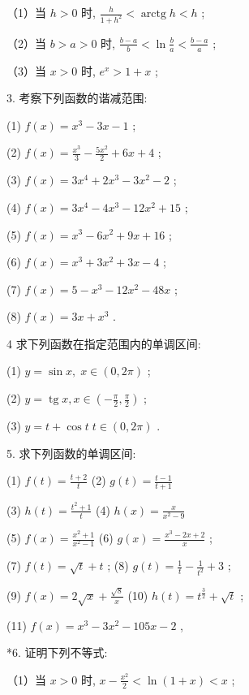 \documentclass[10pt]{article}
\begin{document}
（1）当 \(h > 0\) 时, \(\frac{h}{1 + {h}^{2}} < \operatorname{arctg}h < h\) ;

（2）当 \(b > a > 0\) 时, \(\frac{b - a}{b} < \ln \frac{b}{a} < \frac{b - a}{a}\) ;

（3）当 \(x > 0\) 时, \({e}^{x} > 1 + x\) ;

3. 考察下列函数的谐减范围:

(1) \(f\left( x\right) = {x}^{3} - {3x} - 1\) ;

(2) \(f\left( x\right) = \frac{{x}^{3}}{3} - \frac{5{x}^{2}}{2} + {6x} + 4\) ;

(3) \(f\left( x\right) = 3{x}^{4} + 2{x}^{3} - 3{x}^{2} - 2\) ;

(4) \(f\left( x\right) = 3{x}^{4} - 4{x}^{3} - {12}{x}^{2} + {15}\) ;

(5) \(f\left( x\right) = {x}^{3} - 6{x}^{2} + {9x} + {16}\) ;

(6) \(f\left( x\right) = {x}^{3} + 3{x}^{2} + {3x} - 4\) ;

(7) \(f\left( x\right) = 5 - {x}^{3} - {12}{x}^{2} - {48x}\) ;

(8) \(f\left( x\right) = {3x} + {x}^{3}\) .

4 求下列函数在指定范围内的单调区间:

(1) \(y = \sin x,\;x \in \left( {0,{2\pi }}\right)\) ;

(2) \(y = \operatorname{tg}x,x \in \left( {-\frac{\pi }{2},\frac{\pi }{2}}\right)\) ;

(3) \(y = t + \cos t\;t \in \left( {0,{2\pi }}\right)\) .

5. 求下列函数的单调区间:

(1) \(f\left( t\right) = \frac{t + 2}{t}\) (2) \(g\left( t\right) = \frac{t - 1}{t + 1}\)

(3) \(h\left( t\right) = \frac{{t}^{2} + 1}{t}\) (4) \(h\left( x\right) = \frac{x}{{x}^{2} - 9}\)

(5) \(f\left( x\right) = \frac{{x}^{2} + 1}{{x}^{2} - 1}\) (6) \(g\left( x\right) = \frac{{x}^{3} - {2x} + 2}{x}\) ;

(7) \(f\left( t\right) = \sqrt{t} + t\) ; (8) \(g\left( t\right) = \frac{1}{t} - \frac{1}{{t}^{2}} + 3\) ;

(9) \(f\left( x\right) = 2\sqrt{x} + \frac{\sqrt{8}}{x}\) (10) \(h\left( t\right) = {t}^{\frac{3}{2}} + \sqrt{t}\) ;

(11) \(f\left( x\right) = {x}^{3} - 3{x}^{2} - {105x} - 2\) ,

*6. 证明下列不等式:

（1）当 \(x > 0\) 时, \(x - \frac{{x}^{2}}{2} < \ln \left( {1 + x}\right) < x\) ;
\end{document}
